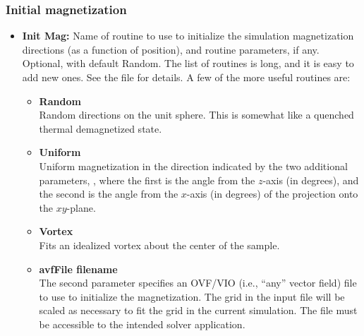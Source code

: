 \subsubsection{Initial magnetization}
\begin{itemize}
   \item {\bf Init Mag:} Name of routine to use to initialize the
   simulation magnetization directions (as a function of position), and
   routine parameters, if any.  Optional, with default Random.  The list
   of routines is long, and it is easy to add new ones.  See the file
    for details.  A few of the more
   useful routines are:
   \begin{itemize}
      \item {\bf Random}\\
         Random directions on the unit sphere.  This
         is somewhat like a quenched thermal demagnetized state.
      \item {\bf Uniform \latex{\boldmath$\theta$ $\phi$}}\\
         Uniform magnetization in the direction
         indicated by the two additional parameters, , where the first is the angle
         from the $z$-axis (in degrees), and the second is the angle
         from the $x$-axis (in degrees) of the projection onto the
         $xy$-plane.
      \item {\bf Vortex}\\
         Fits an idealized vortex about the center of the
         sample.
      \item {\bf avfFile filename}\\
         The second parameter specifies an OVF/VIO (i.e., ``any''
         vector field) file to use to
         initialize the magnetization. The grid in the input file will
         be scaled as necessary to fit the grid in the current
         simulation.  The file must be accessible to the intended solver
         application.
   \end{itemize}
\end{itemize}

